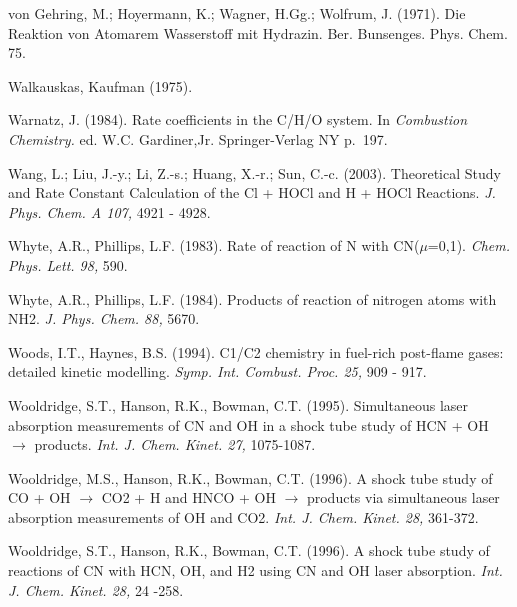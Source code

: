 \documentclass[12pt,landscape]{article}
\newcounter{reaction}
\begin{document}
von Gehring, M.; Hoyermann, K.; Wagner, H.Gg.; Wolfrum, J. (1971).  Die Reaktion von Atomarem Wasserstoff mit Hydrazin.  Ber. Bunsenges. Phys. Chem. 75.


Walkauskas, Kaufman (1975). 

Warnatz, J. (1984).  Rate coefficients in the C/H/O system.  In {\em Combustion Chemistry.} ed. W.C. Gardiner,Jr.  Springer-Verlag NY p.\ 197.


Wang, L.; Liu, J.-y.; Li, Z.-s.; Huang, X.-r.; Sun, C.-c. (2003).  Theoretical Study and Rate Constant Calculation of the Cl + HOCl and H + HOCl Reactions. {\em J. Phys. Chem. A 107,} 4921 - 4928.  %

Whyte, A.R., Phillips, L.F. (1983).  Rate of reaction of N with CN($\mu$=0,1). {\em Chem. Phys. Lett.  98,} 590.

Whyte, A.R., Phillips, L.F. (1984).  Products of reaction of nitrogen atoms with NH2. {\em J. Phys. Chem.  88,} 5670.

Woods, I.T., Haynes, B.S. (1994). C1/C2 chemistry in fuel-rich post-flame gases: detailed kinetic modelling. {\em Symp. Int. Combust. Proc. 25,} 909 - 917.

Wooldridge, S.T., Hanson, R.K., Bowman, C.T. (1995). Simultaneous laser absorption measurements of CN and OH in a shock tube study of HCN + OH $\rightarrow$ products.  {\em Int. J. Chem. Kinet. 27,} 1075-1087.

Wooldridge, M.S., Hanson, R.K., Bowman, C.T. (1996). A shock tube study of CO + OH $\rightarrow$ CO2 + H and HNCO + OH $\rightarrow$ products via simultaneous laser absorption measurements of OH and CO2.  {\em Int. J. Chem. Kinet. 28,} 361-372.

Wooldridge, S.T., Hanson, R.K., Bowman, C.T. (1996). A shock tube study of reactions of CN with HCN, OH, and H2 using CN and OH laser absorption.   {\em Int. J. Chem. Kinet. 28,} 24 -258.
\end{document}
